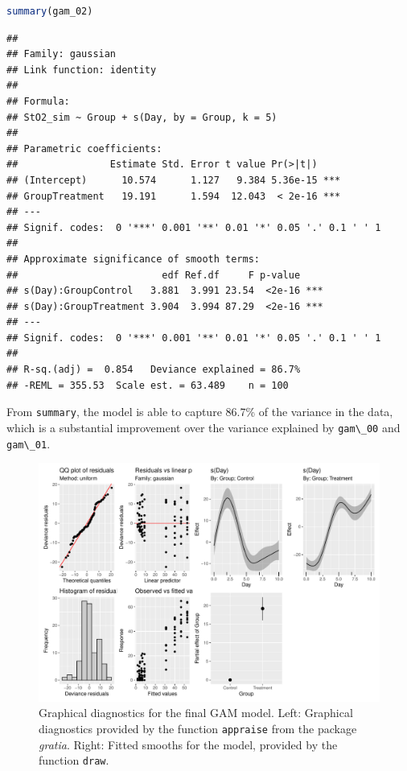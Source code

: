 \documentclass[
]{article}
\newcommand{\passthrough}[1]{#1}
\begin{document}
\begin{lstlisting}[language=R]
summary(gam_02)
\end{lstlisting}

\begin{lstlisting}
## 
## Family: gaussian 
## Link function: identity 
## 
## Formula:
## StO2_sim ~ Group + s(Day, by = Group, k = 5)
## 
## Parametric coefficients:
##                Estimate Std. Error t value Pr(>|t|)    
## (Intercept)      10.574      1.127   9.384 5.36e-15 ***
## GroupTreatment   19.191      1.594  12.043  < 2e-16 ***
## ---
## Signif. codes:  0 '***' 0.001 '**' 0.01 '*' 0.05 '.' 0.1 ' ' 1
## 
## Approximate significance of smooth terms:
##                         edf Ref.df     F p-value    
## s(Day):GroupControl   3.881  3.991 23.54  <2e-16 ***
## s(Day):GroupTreatment 3.904  3.994 87.29  <2e-16 ***
## ---
## Signif. codes:  0 '***' 0.001 '**' 0.01 '*' 0.05 '.' 0.1 ' ' 1
## 
## R-sq.(adj) =  0.854   Deviance explained = 86.7%
## -REML = 355.53  Scale est. = 63.489    n = 100
\end{lstlisting}

From \passthrough{\lstinline!summary!}, the model is able to capture 86.7\% of the variance in the data, which is a substantial improvement over the variance explained by \passthrough{\lstinline!gam\_00!} and \passthrough{\lstinline!gam\_01!}.



\begin{figure}

{\centering \includegraphics[width=0.75\linewidth]{Appendix_A_files/figure-latex/final-GAM-diag-1} 

}

\caption{Graphical diagnostics for the final GAM model. Left: Graphical diagnostics provided by the function \passthrough{\lstinline!appraise!} from the package \emph{gratia}. Right: Fitted smooths for the model, provided by the function \passthrough{\lstinline!draw!}.}\label{fig:final-GAM-diag}
\end{figure}
\end{document}
